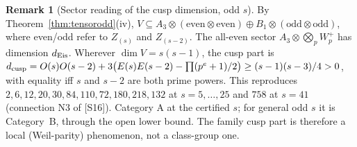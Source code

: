 \documentclass[11pt]{article}
\theoremstyle{definition}
\newtheorem{remark}[theorem]{Remark}
\theoremstyle{plain}
\newcommand{\src}[1]{\textup{[S#1]}}
\begin{document}
\begin{remark}[Sector reading of the cusp dimension, odd $s$]
By Theorem~\ref{thm:tensorodd}(iv), $V\subseteq A_3\otimes(\text{even}\otimes\text{even})\oplus B_1\otimes(\text{odd}\otimes\text{odd})$, where even/odd refer to $Z_{(s)}$ and $Z_{(s-2)}$.
The all-even sector $A_3\otimes\bigotimes_pW_p^+$ has dimension $d_{\rm Eis}$. Wherever $\dim V=s(s-1)$, the cusp part is
$d_{\rm cusp}=O(s)O(s-2)+3\bigl(E(s)E(s-2)-\prod(p^e+1)/2\bigr)\ge(s-1)(s-3)/4>0$, with equality iff $s$ and $s-2$ are both prime powers. This reproduces
$2,6,12,20,30,84,110,72,180,218,132$ at $s=5,\dots,25$ and $758$ at $s=41$ (connection N3 of \src{16}). Category A at the certified $s$; for general odd $s$
it is Category~B, through the open lower bound. The family cusp part is therefore a local (Weil-parity) phenomenon, not a class-group one.
\end{remark}
\end{document}

